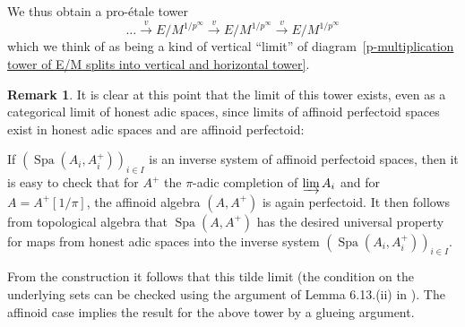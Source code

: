 \documentclass[10pt,oneside]{amsart}
\theoremstyle{definition}
\newtheorem{remark}[theorem]{Remark}
\begin{document}
	We thus obtain a pro-\'etale tower
	\begin{equation}\label{proetale tower in the vertical limit}
	\dots \xrightarrow{v}E/M^{1/p^\infty}\xrightarrow{v} E/M^{1/p^\infty}\xrightarrow{v} E/M^{1/p^\infty}
	\end{equation}
	which we think of as being a kind of vertical ``limit'' of diagram~\ref{p-multiplication tower of E/M splits into vertical and horizontal tower}. 
	\begin{remark}\label{projective limits of perfectoid spaces as adic spaces}
	It is clear at this point that the limit of this tower exists, even as a categorical limit of honest adic spaces, since limits of affinoid perfectoid spaces exist in honest adic spaces and are affinoid perfectoid:
	
	If $(\operatorname{Spa}(A_i,A_i^{+}))_{i\in I}$ is an inverse system of affinoid perfectoid spaces, then it is easy to check that for $A^+$ the $\pi$-adic completion of $\varinjlim A_i$ and for $A = A^+[1/\pi]$, the affinoid algebra $(A,A^{+})$ is again perfectoid. It then follows from topological algebra that $\operatorname {Spa}(A,A^{+})$ has the desired universal property for maps from honest adic spaces into the inverse system $(\operatorname{Spa}(A_i,A_i^{+}))_{i\in I}$.
	
	From the construction it follows that this tilde limit (the condition on the underlying sets can be checked using the argument of Lemma 6.13.(ii) in \cite{perfectoid IHES}). The affinoid case implies the result for the above tower by a glueing argument.
	\end{remark}
	
\end{document}
